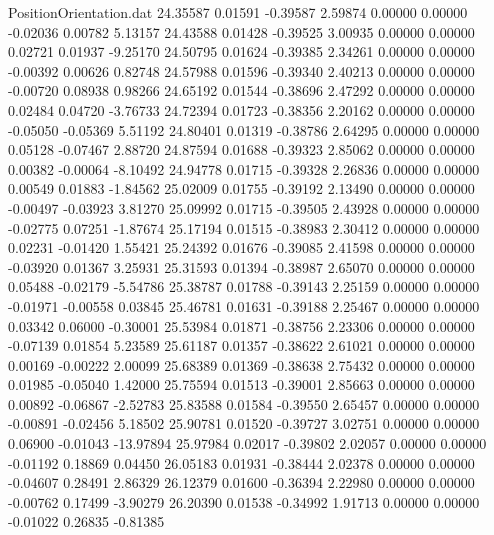 \begin{filecontents}{PositionOrientation.dat}
  24.35587    0.01591   -0.39587     2.59874    0.00000    0.00000   -0.02036    0.00782    5.13157
  24.43588    0.01428   -0.39525     3.00935    0.00000    0.00000    0.02721    0.01937   -9.25170
  24.50795    0.01624   -0.39385     2.34261    0.00000    0.00000   -0.00392    0.00626    0.82748
  24.57988    0.01596   -0.39340     2.40213    0.00000    0.00000   -0.00720    0.08938    0.98266
  24.65192    0.01544   -0.38696     2.47292    0.00000    0.00000    0.02484    0.04720   -3.76733
  24.72394    0.01723   -0.38356     2.20162    0.00000    0.00000   -0.05050   -0.05369    5.51192
  24.80401    0.01319   -0.38786     2.64295    0.00000    0.00000    0.05128   -0.07467    2.88720
  24.87594    0.01688   -0.39323     2.85062    0.00000    0.00000    0.00382   -0.00064   -8.10492
  24.94778    0.01715   -0.39328     2.26836    0.00000    0.00000    0.00549    0.01883   -1.84562
  25.02009    0.01755   -0.39192     2.13490    0.00000    0.00000   -0.00497   -0.03923    3.81270
  25.09992    0.01715   -0.39505     2.43928    0.00000    0.00000   -0.02775    0.07251   -1.87674
  25.17194    0.01515   -0.38983     2.30412    0.00000    0.00000    0.02231   -0.01420    1.55421
  25.24392    0.01676   -0.39085     2.41598    0.00000    0.00000   -0.03920    0.01367    3.25931
  25.31593    0.01394   -0.38987     2.65070    0.00000    0.00000    0.05488   -0.02179   -5.54786
  25.38787    0.01788   -0.39143     2.25159    0.00000    0.00000   -0.01971   -0.00558    0.03845
  25.46781    0.01631   -0.39188     2.25467    0.00000    0.00000    0.03342    0.06000   -0.30001
  25.53984    0.01871   -0.38756     2.23306    0.00000    0.00000   -0.07139    0.01854    5.23589
  25.61187    0.01357   -0.38622     2.61021    0.00000    0.00000    0.00169   -0.00222    2.00099
  25.68389    0.01369   -0.38638     2.75432    0.00000    0.00000    0.01985   -0.05040    1.42000
  25.75594    0.01513   -0.39001     2.85663    0.00000    0.00000    0.00892   -0.06867   -2.52783
  25.83588    0.01584   -0.39550     2.65457    0.00000    0.00000   -0.00891   -0.02456    5.18502
  25.90781    0.01520   -0.39727     3.02751    0.00000    0.00000    0.06900   -0.01043  -13.97894
  25.97984    0.02017   -0.39802     2.02057    0.00000    0.00000   -0.01192    0.18869    0.04450
  26.05183    0.01931   -0.38444     2.02378    0.00000    0.00000   -0.04607    0.28491    2.86329
  26.12379    0.01600   -0.36394     2.22980    0.00000    0.00000   -0.00762    0.17499   -3.90279
  26.20390    0.01538   -0.34992     1.91713    0.00000    0.00000   -0.01022    0.26835   -0.81385

\end{filecontents}
